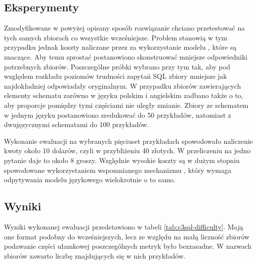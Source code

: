 \subsection{Eksperymenty}
Zmodyfikowane w powyżej opisany sposób rozwiązanie  chciano przetestować na tych samych zbiorach co wszystkie wcześniejsze. Problem stanowią w tym przypadku jednak koszty naliczane przez  za wykorzystanie modelu , które są znaczące. Aby temu sprostać postanowiono skonstruować mniejsze odpowiedniki potrzebnych zbiorów. Poszczególne próbki wybrano przy tym tak, aby pod względem rozkładu poziomów trudności zapytań SQL zbiory mniejsze jak najdokładniej odpowiadały oryginalnym. W przypadku zbiorów zawierających elementy schematu zarówno w języku polskim i angielskim zadbano także o to, aby proporcje pomiędzy tymi częściami nie uległy zmianie. Zbiory ze schematem w jednym języku postanowiono zredukować do 50 przykładów, natomiast z dwujęzycznymi schematami do 100 przykładów. 

Wykonanie ewaluacji na wybranych pięciuset przykładach spowodowało naliczenie kwoty około 10 dolarów, czyli w przybliżeniu 40 złotych. W przeliczeniu na jedno pytanie daje to około 8 groszy. Względnie wysokie koszty są w dużym stopniu spowodowane wykorzystaniem wspomnianego mechanizmu , który wymaga odpytywania modelu językowego wielokrotnie o to samo. 

\subsection{Wyniki}
Wyniki wykonanej ewaluacji przedstawiono w tabeli \ref{tab:c3sql-difficulty}. Mają one format podobny do wcześniejszych, lecz ze względu na małą liczność zbiorów podawanie części ułamkowej poszczególnych metryk było bezzasadne. W nazwach zbiorów zawarto liczbę znajdujących się w nich przykładów.

